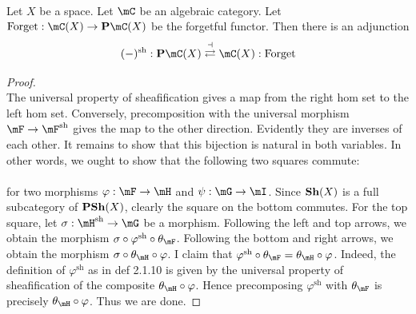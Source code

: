 \documentclass[a4paper]{article}
\begin{document}
\begin{prp}{}{}\\
Let $X$ be a space. Let $\mC$ be an algebraic category. Let $\text{Forget}:\mC(X)\to\bold{P}\mC(X)$ be the forgetful functor. Then there is an adjunction $$(-)^\text{sh}:\bold{P}\mC(X)\overset{\dashv}{\rightleftarrows}\mC(X):\text{Forget}$$
\begin{proof}\\
The universal property of sheafification gives a map from the right hom set to the left hom set. Conversely, precomposition with the universal morphism $\mF\to\mF^\text{sh}$ gives the map to the other direction. Evidently they are inverses of each other. It remains to show that this bijection is natural in both variables. In other words, we ought to show that the following two squares commute: \\
 \\
for two morphisms $\varphi:\mF\to\mH$ and $\psi:\mG\to\mI$. Since $\bold{Sh}(X)$ is a full subcategory of $\bold{PSh}(X)$, clearly the square on the bottom commutes. For the top square, let $\sigma:\mH^\text{sh}\to\mG$ be a morphism. Following the left and top arrows, we obtain the morphism $\sigma\circ\varphi^\text{sh}\circ\theta_\mF$. Following the bottom and right arrows, we obtain the morphism $\sigma\circ\theta_\mH\circ\varphi$. I claim that $\varphi^\text{sh}\circ\theta_\mF=\theta_\mH\circ\varphi$. Indeed, the definition of $\varphi^\text{sh}$ as in def 2.1.10 is given by the universal property of sheafification of the composite $\theta_\mH\circ\varphi$. Hence precomposing $\varphi^\text{sh}$ with $\theta_\mF$ is precisely $\theta_\mH\circ\varphi$. Thus we are done. 
\end{proof}
\end{prp}
\end{document}
